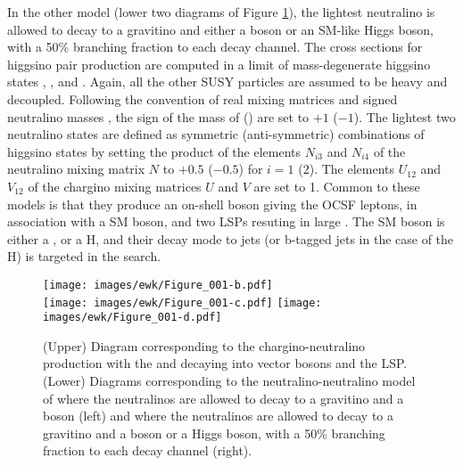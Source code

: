 In the other model (lower two diagrams of Figure \ref{sig:feynmanEWK}), the lightest neutralino is allowed to decay to a gravitino and either a \PZ boson or an SM-like Higgs boson, with a 50\% branching fraction to each decay channel.
The cross sections for higgsino pair production are computed in a limit of mass-degenerate higgsino states \secondchi, \firstcharg, and \firstchi.
Again, all the other SUSY particles are assumed to be heavy and decoupled.
Following the convention of real mixing matrices and signed neutralino masses \cite{Skands:2003cj}, the sign of the mass of \firstchi (\secondchi) are set to $+1$ ($-1$).
The lightest two neutralino states are defined as symmetric (anti-symmetric) combinations of higgsino states by setting the product of the elements $N_{i3}$ and $N_{i4}$ of the neutralino mixing matrix $N$ to $+0.5$ ($-0.5$) for $i = 1$ ($2$).
The elements $U_{12}$ and $V_{12}$ of the chargino mixing matrices $U$ and $V$ are set to 1.
Common to these models is that they produce an on-shell \PZ boson giving the OCSF leptons, in association with a SM boson, and two LSPs resuting in large \ptmiss. 
The SM boson is either a \PW, \PZ or a H, and their decay mode to jets (or b-tagged jets in the case of the H) is targeted in the search.   
\begin{figure}[!htp]
\centering
\texttt{[image: images/ewk/Figure\_001-b.pdf]}\\
\texttt{[image: images/ewk/Figure\_001-c.pdf]}
\texttt{[image: images/ewk/Figure\_001-d.pdf]}
\caption{(Upper) Diagram corresponding to the chargino-neutralino production with the \firstcharg and \secondchi decaying into vector bosons and the LSP. 
(Lower) Diagrams corresponding to the neutralino-neutralino model of where the neutralinos are allowed to decay to a gravitino and a \PZ boson (left) and where the neutralinos are allowed to decay to a gravitino and a \PZ boson or a Higgs boson, with a 50\% branching fraction to each decay channel (right).}
\label{sig:feynmanEWK}
\end{figure}                                                                                                                                 
